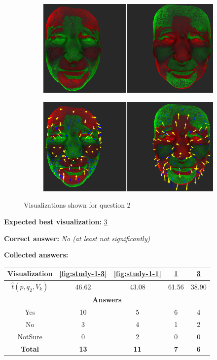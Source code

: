 \begin{figure}[h]
\begin{subfigure}{0.4\textwidth}
\includegraphics[width=\textwidth]{./screenshots/pair2.PNG}
\caption{}
\label{fig:study-1-2}
\end{subfigure}
\quad
\begin{subfigure}{0.4\textwidth}
\includegraphics[width=\textwidth]{./screenshots/pair4.PNG}
\caption{}
\label{fig:study-1-4}
\end{subfigure}
\caption{Visualizations shown for question 2}
\end{figure}
\medskip

{\bf Expected best visualization:} \ref{fig:study-1-4}
\medskip

{\bf Correct answer:} {\it No (at least not significantly)}
\medskip

{\bf Collected answers:}

\begin{center}
\begin{tabular}{| c | c | c | c | c |}
	\hline
	Visualization & \ref{fig:study-1-3} & \ref{fig:study-1-1} & \ref{fig:study-1-2} & \ref{fig:study-1-4}\\ \hline
	\(\widehat{t}(p, q_2, V_k)\) & 46.62 & 43.08 & 61.56 & 38.90\\ \hline
	\multicolumn{5}{|c|}{\bf Answers} \\ \hline
	Yes & 10 & 5 & 6 & 4\\ \hline
	\rowcolor{yellow!30} No & 3 & 4 & 1 & 2\\ \hline
	NotSure & 0 & 2 & 0 & 0\\ \hline
	{\bf Total} & {\bf 13} & {\bf 11} & {\bf 7} & {\bf 6}\\ \hline
\end{tabular}
\end{center}
\clearpage

